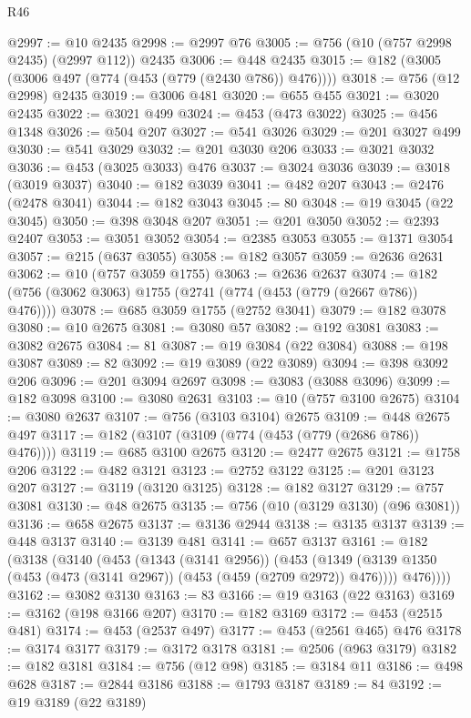 \begin{lexlean}{R46}
\begin{coremodule}
@2997 := @10 @2435
@2998 := @2997 @76
@3005 := @756 (@10 (@757 @2998 @2435) (@2997 @112)) @2435
@3006 := @448 @2435
@3015 := @182 (@3005 (@3006 @497 (@774 (@453 (@779 (@2430 @786)) @476))))
@3018 := @756 (@12 @2998) @2435
@3019 := @3006 @481
@3020 := @655 @455
@3021 := @3020 @2435
@3022 := @3021 @499
@3024 := @453 (@473 @3022)
@3025 := @456 @1348
@3026 := @504 @207
@3027 := @541 @3026
@3029 := @201 @3027 @499
@3030 := @541 @3029
@3032 := @201 @3030 @206
@3033 := @3021 @3032
@3036 := @453 (@3025 @3033) @476
@3037 := @3024 @3036
@3039 := @3018 (@3019 @3037)
@3040 := @182 @3039
@3041 := @482 @207
@3043 := @2476 (@2478 @3041)
@3044 := @182 @3043
@3045 := 80
@3048 := @19 @3045 (@22 @3045)
@3050 := @398 @3048 @207
@3051 := @201 @3050
@3052 := @2393 @2407
@3053 := @3051 @3052
@3054 := @2385 @3053
@3055 := @1371 @3054
@3057 := @215 (@637 @3055)
@3058 := @182 @3057
@3059 := @2636 @2631
@3062 := @10 (@757 @3059 @1755)
@3063 := @2636 @2637
@3074 := @182 (@756 (@3062 @3063) @1755 (@2741 (@774 (@453 (@779 (@2667 @786)) @476))))
@3078 := @685 @3059 @1755 (@2752 @3041)
@3079 := @182 @3078
@3080 := @10 @2675
@3081 := @3080 @57
@3082 := @192 @3081
@3083 := @3082 @2675
@3084 := 81
@3087 := @19 @3084 (@22 @3084)
@3088 := @198 @3087
@3089 := 82
@3092 := @19 @3089 (@22 @3089)
@3094 := @398 @3092 @206
@3096 := @201 @3094 @2697
@3098 := @3083 (@3088 @3096)
@3099 := @182 @3098
@3100 := @3080 @2631
@3103 := @10 (@757 @3100 @2675)
@3104 := @3080 @2637
@3107 := @756 (@3103 @3104) @2675
@3109 := @448 @2675 @497
@3117 := @182 (@3107 (@3109 (@774 (@453 (@779 (@2686 @786)) @476))))
@3119 := @685 @3100 @2675
@3120 := @2477 @2675
@3121 := @1758 @206
@3122 := @482 @3121
@3123 := @2752 @3122
@3125 := @201 @3123 @207
@3127 := @3119 (@3120 @3125)
@3128 := @182 @3127
@3129 := @757 @3081
@3130 := @48 @2675
@3135 := @756 (@10 (@3129 @3130) (@96 @3081))
@3136 := @658 @2675
@3137 := @3136 @2944
@3138 := @3135 @3137
@3139 := @448 @3137
@3140 := @3139 @481
@3141 := @657 @3137
@3161 := @182
    (@3138
      (@3140
        (@453
          (@1343 (@3141 @2956))
          (@453
            (@1349 (@3139 @1350 (@453 (@473 (@3141 @2967)) (@453 (@459 (@2709 @2972)) @476))))
            @476))))
@3162 := @3082 @3130
@3163 := 83
@3166 := @19 @3163 (@22 @3163)
@3169 := @3162 (@198 @3166 @207)
@3170 := @182 @3169
@3172 := @453 (@2515 @481)
@3174 := @453 (@2537 @497)
@3177 := @453 (@2561 @465) @476
@3178 := @3174 @3177
@3179 := @3172 @3178
@3181 := @2506 (@963 @3179)
@3182 := @182 @3181
@3184 := @756 (@12 @98)
@3185 := @3184 @11
@3186 := @498 @628
@3187 := @2844 @3186
@3188 := @1793 @3187
@3189 := 84
@3192 := @19 @3189 (@22 @3189)

\end{coremodule}
\end{lexlean}
